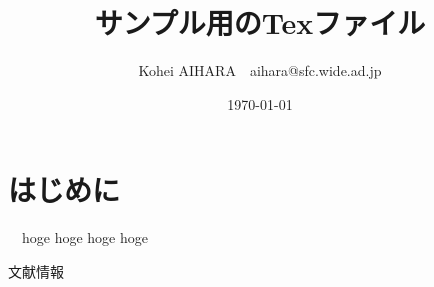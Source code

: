 \documentclass[twocolumn, a4j]{article}
\title{サンプル用のTexファイル}
\author{Kohei AIHARA\footnotemark[2]　aihara@sfc.wide.ad.jp}
\date{\today}
\renewcommand{\thefootnote}{\fnsymbol{footnote}}
\renewcommand{\thefootnote}{\arabic{footnote}}
\begin{document}

\renewcommand{\thefootnote}{\fnsymbol{footnote}}
\renewcommand{\thefootnote}{\arabic{footnote}}

\section{はじめに}

  　hoge hoge hoge hoge

\renewcommand{\refname}{参考文献}
\begin{thebibliography}{数字}
   文献情報
\end{thebibliography}
\end{document}
